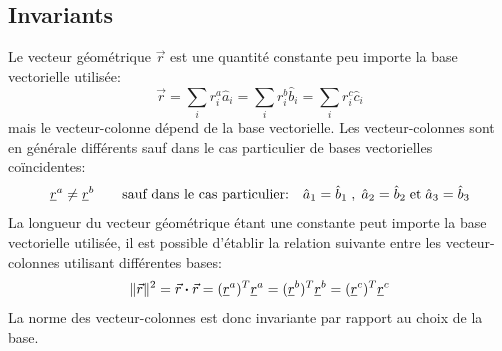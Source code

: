\subsection{Invariants} 
%
Le vecteur géométrique $\vec{r}$ est une quantité constante peu importe la base vectorielle utilisée: 
\begin{equation}
\vec{r} = \sum_{i} r_i^a \hat{a}_i = \sum_{i} r_i^b \hat{b}_i = \sum_{i} r_i^c \hat{c}_i
\end{equation}
mais le vecteur-colonne dépend de la base vectorielle. Les vecteur-colonnes sont en générale différents sauf dans le cas particulier de bases vectorielles coïncidentes:
\begin{equation}
\underline{r}^{a} \ne \underline{r}^{b} \quad\quad \text{sauf dans le cas particulier:} \quad \hat{a}_1 = \hat{b}_1 \;,\; \hat{a}_2 = \hat{b}_2  \;\text{et}\; \hat{a}_3 = \hat{b}_3 
\end{equation} 
La longueur du vecteur géométrique étant une constante peut importe la base vectorielle utilisée, il est possible d'établir la relation suivante entre les vecteur-colonnes utilisant différentes bases:
\begin{equation}
\|\vec{r}\|^2 = \vec{r} \boldsymbol{\cdot} \vec{r} = (\underline{r}^{a})^T \underline{r}^{a} = (\underline{r}^{b})^T \underline{r}^{b} = (\underline{r}^{c})^T \underline{r}^{c}
\end{equation}
La norme des vecteur-colonnes est donc invariante par rapport au choix de la base. 





